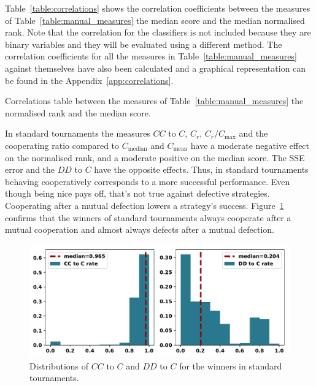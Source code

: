 \documentclass{article}
\begin{document}
Table~\ref{table:correlations} shows the correlation coefficients between the
measures of Table~\ref{table:manual_measures} the median score and the median
normalised rank. Note that the correlation for the classifiers is
not included because they are binary variables and they will be evaluated using a
different method. The correlation coefficients for all the measures in
Table~\ref{table:manual_measures} against themselves have also been calculated and a
graphical representation can be found in the Appendix~\ref{app:correlations}.

\begin{table}[!htbp]
    \begin{center}
    \resizebox{.9\textwidth}{!}{
        
    }
\end{center}
\caption{Correlations table between the measures of Table~\ref{table:manual_measures}
the normalised rank and the median score.}\label{table:correlations}
\end{table}

In standard tournaments the measures  $CC$ to $C$, $C_r$, $C_r / C_{\text{max}}$
and the cooperating ratio compared to $C_{\text{median}}$ and $C_{\text{mean}}$
have a moderate negative effect on the normalised rank, and a moderate positive
on the median score. The SSE error and the $DD$ to $C$ have the opposite
effects. Thus, in standard tournaments behaving cooperatively corresponds to a
more successful performance. Even though being nice pays off,
that's not true against defective strategies. Cooperating after a mutual
defection lowers a strategy's success.
Figure~\ref{fig:rates_of_winners_in_standard_tournaments} confirms that the
winners of standard tournaments always cooperate after a mutual cooperation and
almost always defects after a mutual defection.

\begin{figure}[!htbp]
    \centering
    \includegraphics[width=.7\textwidth]{../images/rates_of_winners_in_standard_tournaments.pdf}
    \caption{Distributions of $CC$ to $C$ and $DD$ to $C$ for the winners in
    standard tournaments.}\label{fig:rates_of_winners_in_standard_tournaments}
\end{figure}
\end{document}
